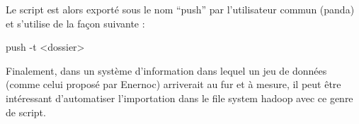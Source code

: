 \par Le script est alors exporté sous le nom “push” par l’utilisateur commun (panda) et s’utilise de la façon suivante :

\begin{unix}{push -t <dossier>}\end{unix}

Finalement, dans un système d’information dans lequel un jeu de données (comme celui proposé par Enernoc) arriverait au fur et à mesure, il peut être intéressant d’automatiser l’importation dans le file system hadoop avec ce genre de script.

